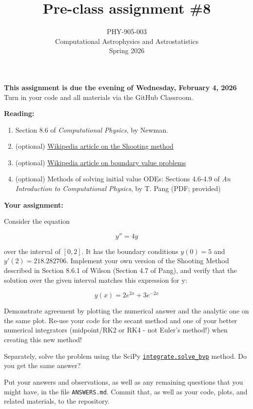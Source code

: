 \documentclass[10pt]{article}
\title{Pre-class assignment \#8}
\author{PHY-905-003\\Computational Astrophysics and
  Astrostatistics\\Spring 2026}
\date{} %
\begin{document}
 
\maketitle

\vspace{-5mm}

\noindent
\textbf{This assignment is due the evening of Wednesday, February 4, 2026}
 Turn in your code
and all materials via the GitHub Classroom.

\vspace{5mm}

\noindent
\textbf{Reading:}

\begin{enumerate}


\item Section 8.6 of  \textit{Computational Physics}, by Newman. 

\item  (optional)
  \href{https://en.wikipedia.org/wiki/Shooting_method}{Wikipedia article
    on the Shooting method} 

\item (optional)
  \href{https://en.wikipedia.org/wiki/Boundary_value_problem}{Wikipedia article
    on boundary value problems}  

\item (optional) Methods of solving initial value ODEs: Sections 4.6-4.9  of \textit{An Introduction to Computational Physics},
  by T. Pang (PDF; provided)

\end{enumerate}

\noindent
\textbf{Your assignment:}

\vspace{3mm}
\noindent
Consider the equation

\begin{equation}
y'' = 4y
\end{equation}

over the interval of $[0,2]$.  It has the boundary conditions $y(0) =
5$ and $y'(2) = 218.282706$.  Implement your own version of the
Shooting Method described in Section 8.6.1 of Wilson (Section 4.7 of Pang), and verify that the
solution over the given interval matches this expression for y:

\begin{equation} 
y(x) = 2 e^{2x} + 3 e^{-2x}
\end{equation}

Demonstrate agreement by plotting the numerical answer and the
analytic one on the same plot.  Re-use your code for the secant method
and one of your better numerical integrators (midpoint/RK2 or RK4 -
not Euler's method!) when creating this new method!

Separately, solve the problem using the
SciPy
\href{https://docs.scipy.org/doc/scipy/reference/generated/scipy.integrate.solve_bvp.html}{\texttt{integrate.solve\_bvp}}
method.  Do you get the same answer?

Put your answers and observations, as well as any remaining questions
that you might have, in the file \texttt{ANSWERS.md}.  Commit that, as
well as your code, plots, and related materials, to the repository.
\end{document}

